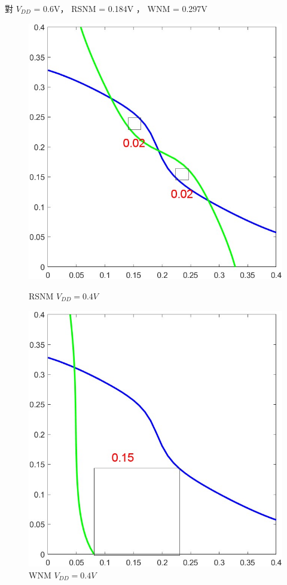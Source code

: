 \documentclass{article}
\begin{document}
\vspace*{-1cm}
對 $V_{DD}$ = 0.6V， RSNM = 0.184V ， WNM = 0.297V

\begin{figure}[H]
\centering
\begin{minipage}[t]{0.28\textwidth}
\centering
    \includegraphics[width=\textwidth]{./img/2023-11-12-04-41-33.png}
\caption{RSNM $V_{DD} = 0.4V$}
\label{8rsnm04}
\end{minipage}
\qquad
\begin{minipage}[t]{0.28\textwidth}
\centering
    \includegraphics[width=\textwidth]{./img/2023-11-12-04-41-44.png}
\caption{WNM $V_{DD} = 0.4V$}
\label{8wnm04}
\end{minipage}
\end{figure}
    
\end{document}

